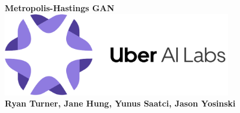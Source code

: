 \documentclass[a0,landscape]{a0poster}
\begin{document}


\begin{centering}{\fontsize{100}{120} \selectfont \color{NavyBlue} \textbf{Metropolis-Hastings GAN} \color{Black}}\\ %
\includegraphics[width=10cm]{uber_ai_logo_bootleg.pdf} \\ %
\Huge \textbf{Ryan Turner, Jane Hung, Yunus Saatci, Jason Yosinski}\\ %
\end{centering}
%

%

\end{document}
